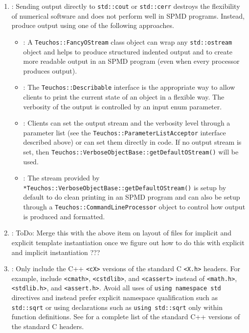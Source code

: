 \begin{enumerate}
{}\item\GCGStdStream: Sending output directly to {}\texttt{std\-::cout} or
{}\texttt{std\-::cerr} destroys the flexibility of numerical software and does
not perform well in SPMD programs.  Instead, produce output using one of the
following approaches.

\begin{itemize}

{}\item\GCGTeuchosFancyOStream: A {}\texttt{Teuchos\-::Fancy\-OStream} class object
can wrap any {}\texttt{std\-::ostream} object and helps to produce structured
indented output and to create more readable output in an SPMD program (even
when every processor produces output).

{}\item\GCGTeuchosDescribable: The {}\texttt{Teuchos\-::Describable} interface is
the appropriate way to allow clients to print the current state of an object
in a flexible way.  The verbosity of the output is controlled by an input enum
parameter.

{}\item\GCGTeuchosVerboseObject: Clients can set the output stream and the
verbosity level through a parameter list (see the
{}\texttt{Teuchos\-::ParameterListAcceptor} interface described above) or can
set them directly in code.  If no output stream is set, then
{}\texttt{Teuchos\-::Verbose\-Object\-Base\-::get\-Default\-OStream()} will be
used.

{}\item\GCGTeuchosVerboseObjectBaseDefaultOStream: The stream provided by
{}\texttt{*Teuchos\-::Verbose\-Object\-Base\-::get\-Default\-OStream()} is
setup by default to do clean printing in an SPMD program and can also be setup
through a {}\texttt{Teuchos\-::Command\-Line\-Processor} object to control how
output is produced and formatted.

\end{itemize}

{}\item\GCGTemplateHeaders: ToDo: Merge this with the above item on layout of files
for implicit and explicit template instantiation once we figure out how to do
this with explicit and implicit instantiation ???

{}\item\GCGStandardCppHeaders: Only include the C++ {}\texttt{<cX>} versions of the
standard C {}\texttt{<X.h>} headers.  For example, include {}\texttt{<cmath>},
{}\texttt{<cstdlib>}, and {}\texttt{<cassert>} instead of {}\texttt{<math.h>},
{}\texttt{<stdlib.h>}, and {}\texttt{<assert.h>}.  Avoid all uses of
{}\texttt{using namespace std} directives and instead prefer explicit
namespace qualification such as {}\texttt{std::sqrt} or using declarations
such as {}\texttt{using std::sqrt} only within function definitions.  See
{}\cite[Section ???]{stroustrup97} for a complete list of the standard C++
versions of the standard C headers.


\end{enumerate}
